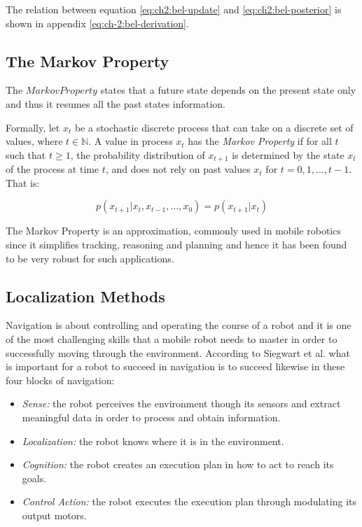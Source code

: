 The relation between equation \ref{eq:ch2:bel-update} and \ref{eq:ch2:bel-posterior} is shown in appendix \ref{eq:ch-2:bel-derivation}.

\subsection{The Markov Property}

The $Markov Property$ states that a future state depends on the present state only and thus it resumes all the past states information.

Formally, let $x_t$ be a stochastic discrete process that can take on a discrete set of values, where $t \in \mathbb{N}$. A value in process $x_t$ has the \textit{Markov Property} if for all $t$ such that $t\geq1$, the probability distribution of $x_{t+1}$ is determined by the state $x_t$ of the process at time $t$, and does not rely on past values $x_t$ for $t = 0, 1, ..., t - 1$\cite{Privault:markov-chains}. That is:

\begin{equation}
p(x_{t+1} | x_t, x_{t-1}, ..., x_0) = p(x_{t+1} | x_t)
\end{equation}

The Markov Property is an approximation, commonly used in mobile robotics since it simplifies tracking, reasoning and planning and hence it has been found to be very robust for such applications\cite{Siegwart:intro-autonumous-robots}. 


\subsection{Localization Methods}

Navigation is about controlling and operating the course of a robot and it is one of the most challenging skills that a mobile robot needs to master in order to successfully moving through the environment. According to Siegwart et al. what is important for a robot to succeed in navigation is to succeed likewise in these four blocks of navigation:

\begin{itemize}
\item \textit{Sense:} the robot perceives the environment though its sensors and extract meaningful data in order to process and obtain information.
\item \textit{Localization:} the robot knows where it is in the environment.
\item \textit{Cognition:} the robot creates an execution plan in how to act to reach its goals.
\item \textit{Control Action:} the robot executes the execution plan through modulating its output motors.
\end{itemize}

